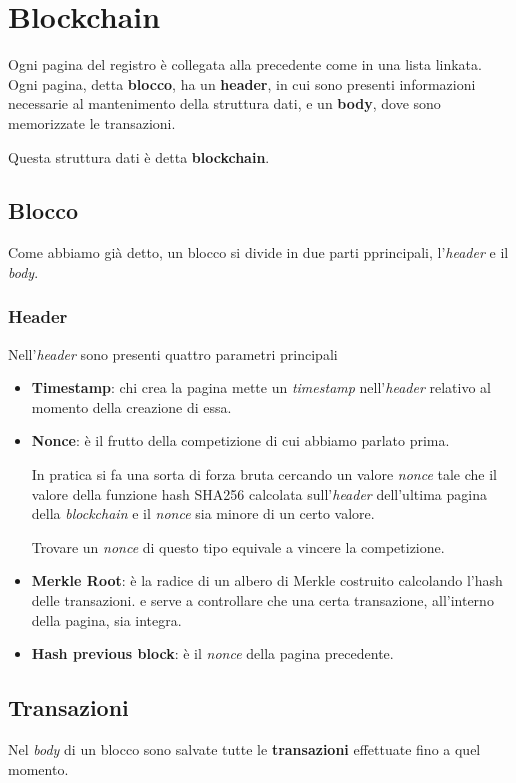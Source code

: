 \section{Blockchain}
Ogni pagina del registro \`e collegata alla precedente come in una lista linkata. Ogni pagina, detta \textbf{blocco},
ha un \textbf{header}, in cui sono presenti informazioni necessarie al mantenimento della struttura dati, e un
\textbf{body}, dove sono memorizzate le transazioni.

Questa struttura dati \`e detta \textbf{blockchain}.

\subsection{Blocco}
Come abbiamo gi\`a detto, un blocco si divide in due parti pprincipali, l'\emph{header} e il \emph{body}.

\subsubsection{Header}
Nell'\emph{header} sono presenti quattro parametri principali
\begin{itemize}
	\item \textbf{Timestamp}: chi crea la pagina mette un \emph{timestamp} nell'\emph{header} relativo al momento
	      della creazione di essa.
	\item \textbf{Nonce}: \`e il frutto della competizione di cui abbiamo parlato prima.

	      In pratica si fa una sorta di forza bruta cercando un valore \emph{nonce} tale che il valore della funzione
	      hash SHA256 calcolata sull'\emph{header} dell'ultima pagina della \emph{blockchain} e il \emph{nonce} sia
	      minore di un certo valore.

	      Trovare un \emph{nonce} di questo tipo equivale a vincere la competizione.
	\item \textbf{Merkle Root}: \`e la radice di un albero di Merkle costruito calcolando l'hash delle transazioni.
	      e serve a controllare che una certa transazione, all'interno della pagina, sia integra.
	\item \textbf{Hash previous block}: \`e il \emph{nonce} della pagina precedente.
\end{itemize}

\subsection{Transazioni}
Nel \emph{body} di un blocco sono salvate tutte le \textbf{transazioni} effettuate fino a quel momento.

